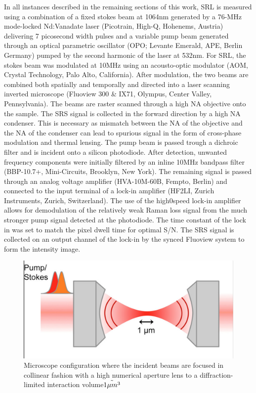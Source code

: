 In all instances described in the remaining sections of this work, SRL is measured using a combination of a fixed stokes beam at 1064nm generated by a 76-MHz mode-locked Nd:Vanadate laser (Picotrain, High-Q, Hohenems, Austria) delivering 7 picosecond width pulses and a variable pump beam generated through an optical parametric oscillator (OPO; Levante Emerald, APE, Berlin Germany) pumped by the second harmonic of the laser at 532nm. For SRL, the stokes beam was modulated at 10MHz using an acousto-optic modulator (AOM, Crystal Technology, Palo Alto, California). After modulation, the two beams are combined both spatially and temporally and directed into a laser scanning inverted microscope (Fluoview 300 \& IX71, Olympus, Center Valley, Pennsylvania). The beams are raster scanned through a high NA objective onto the sample. The SRS signal is collected in the forward direction by a high NA condenser.  This is necessary as mismatch between the NA of the objective and the NA of the condenser can lead to spurious signal in the form of cross-phase modulation and thermal lensing. The pump beam is passed trough a dichroic filter and is incident onto a silicon photodiode.  After detection, unwanted frequency components were initially filtered by an inline 10MHz bandpass filter (BBP-10.7+, Mini-Circuits, Brooklyn, New York). The remaining signal is passed through an analog voltage amplifier (HVA-10M-60B, Fempto, Berlin) and connected to the input terminal of a lock-in amplifier (HF2LI, Zurich Instruments, Zurich, Switzerland). The use of the high0speed lock-in amplifier allows for demodulation of the relatively weak Raman loss signal from the much stronger pump signal detected at the photodiode. The time constant of the lock in was set to match the pixel dwell time for optimal S/N. The SRS signal is collected on an output channel of the lock-in by the synced Fluoview system to form the intensity image. 

\begin{figure}[h]
    \centering
    \includegraphics[width=.7\linewidth]{Figures/focal.png}
    \caption{Microscope configuration where the incident beams are focused in collinear fashion with a high numerical aperture lens to a diffraction-limited interaction volume$\Tilde{1\mu m^3}$}
    \label{fig:focal}
\end{figure}

